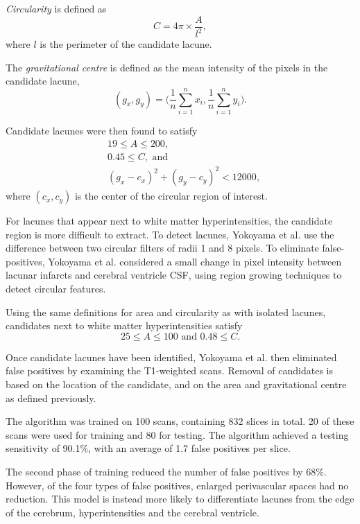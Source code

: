\textit{Circularity} is defined as
\[
	C = 4\pi \times \dfrac{A}{l^2},
\]
where $l$ is the perimeter of the candidate lacune.

The \textit{gravitational centre} is defined as the mean intensity of the pixels in the candidate lacune,
\[
	(g_x, g_y) = \bigg(\dfrac{1}{n}\sum_{i=1}^nx_i, \dfrac{1}{n}\sum_{i=1}^ny_i\bigg).
\]


Candidate lacunes were then found to satisfy
\begin{align*}
	& 19 \le A \le 200, \\
	& 0.45 \le C,\text{ and } \\
	& (g_x - c_x)^2 + (g_y - c_y)^2 < 12000,
\end{align*}
where $(c_x, c_y)$ is the center of the circular region of interest.

For lacunes that appear next to white matter hyperintensities, the candidate region is more difficult to extract. To detect lacunes, Yokoyama et al. use the difference between two circular filters of radii 1 and 8 pixels. To eliminate false-positives, Yokoyama et al. considered a small change in pixel intensity between lacunar infarcts and cerebral ventricle CSF, using region growing techniques to detect circular features.

Using the same definitions for area and circularity as with isolated lacunes, candidates next to white matter hyperintensities satisfy
\[
	25 \le A \le 100\text{ and } 0.48 \le C.
\]

Once candidate lacunes have been identified, Yokoyama et al. then eliminated false positives by examining the T1-weighted scans. Removal of candidates is based on the location of the candidate, and on the area and gravitational centre as defined previously.

The algorithm was trained on 100 scans, containing 832 slices in total. 20 of these scans were used for training and 80 for testing. The algorithm achieved a testing sensitivity of 90.1\%, with an average of 1.7 false positives per slice.

The second phase of training reduced the number of false positives by 68\%. However, of the four types of false positives, enlarged perivascular spaces had no reduction. This model is instead more likely to differentiate lacunes from the edge of the cerebrum, hyperintensities and the cerebral ventricle.

